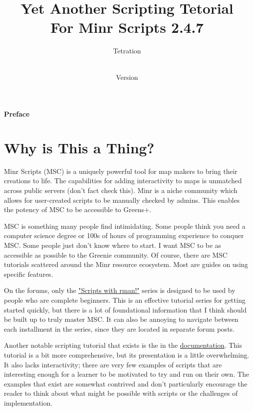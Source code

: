 \documentclass[oneside]{book}
\newcommand{\prefacename}{Preface}
\newenvironment{preface}{
    \vspace*{\stretch{2}}
    {\noindent \bfseries \Huge \prefacename}
    \begin{center}
        \phantomsection \addcontentsline{toc}{chapter}{\prefacename} %
        \thispagestyle{plain}
    \end{center}%
}
{\vspace*{\stretch{5}}}
\begin{document}
\pagestyle{empty}

\title{Yet Another Scripting Tetorial \\
        \large For Minr Scripts 2.4.7}
\author{Tetration}
\date{\vhCurrentDate \\Version \vhCurrentVersion}
\maketitle


\frontmatter
{} 

\begin{preface}
\section*{Why is This a Thing?}
Minr Scripts (MSC) is a uniquely powerful tool for map makers to bring their creations to life. The capabilities for adding interactivity to maps is unmatched across public servers (don't fact check this). Minr is a niche community which allows for user-created scripts to be manually checked by admins. This enables the potency of MSC to be accessible to Greens+.

MSC is something many people find intimidating. Some people think you need a computer science degree or 100s of hours of programming experience to conquer MSC. Some people just don't know where to start. I want MSC to be as accessible as possible to the Greenie community. Of course, there are MSC tutorials scattered around the Minr resource ecosystem. Most are guides on using specific features.

On the forums, only the \href{https://forums.minr.org/threads/scripts-with-rman-1-basic-script-understanding.3193/}{"Scripts with rman!"} series is designed to be used by people who are complete beginners. This is an effective tutorial series for getting started quickly, but there is a lot of foundational information that I think should be built up to truly master MSC. It can also be annoying to navigate between each installment in the series, since they are located in separate forum posts.

Another notable scripting tutorial that exists is the in the \href{https://msc-documentation.readthedocs.io/en/latest/tutorial.html}{documentation}. This tutorial is a bit more comprehensive, but its presentation is a little overwhelming. It also lacks interactivity; there are very few examples of scripts that are interesting enough for a learner to be motivated to try and run on their own. The examples that exist are somewhat contrived and don't particularly encourage the reader to think about what might be possible with scripts or the challenges of implementation.


\end{preface}
\end{document}
